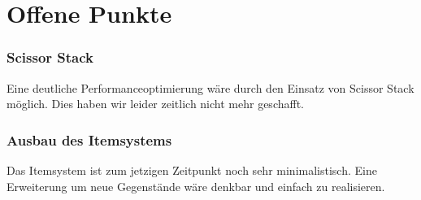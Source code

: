 \documentclass[10pt,a4paper,notitlepage]{scrreprt}
\begin{document}
	\section{Offene Punkte}
		\subsubsection{Scissor Stack}
		Eine deutliche Performanceoptimierung wäre durch den Einsatz von Scissor Stack möglich. Dies haben wir leider zeitlich nicht mehr geschafft.
		
		\subsubsection{Ausbau des Itemsystems}
		Das Itemsystem ist zum jetzigen Zeitpunkt noch sehr minimalistisch. Eine Erweiterung um neue Gegenstände wäre denkbar und einfach zu realisieren.
			
\end{document}
